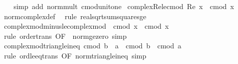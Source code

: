 \begin{isabellebody}
%
\isadelimproof
\ \ %
\endisadelimproof
%
\isatagproof
{}\isamarkupfalse%
\ {\isacharparenleft}{\kern0pt}simp\ add{\isacharcolon}{\kern0pt}\ norm{\isacharunderscore}{\kern0pt}mult\ cmod{\isacharunderscore}{\kern0pt}unit{\isacharunderscore}{\kern0pt}one{\isacharparenright}{\kern0pt}%
\endisatagproof
{\isafoldproof}%
%
\isadelimproof
\isanewline
%
\endisadelimproof
\isanewline
{}\isamarkupfalse%
\ complex{\isacharunderscore}{\kern0pt}Re{\isacharunderscore}{\kern0pt}le{\isacharunderscore}{\kern0pt}cmod{\isacharcolon}{\kern0pt}\ {\isachardoublequoteopen}Re\ x\ {\isasymle}\ cmod\ x{\isachardoublequoteclose}\isanewline
%
\isadelimproof
\ \ %
\endisadelimproof
%
\isatagproof
{}\isamarkupfalse%
\ norm{\isacharunderscore}{\kern0pt}complex{\isacharunderscore}{\kern0pt}def\ \isamarkupfalse%
\ {\isacharparenleft}{\kern0pt}rule\ real{\isacharunderscore}{\kern0pt}sqrt{\isacharunderscore}{\kern0pt}sum{\isacharunderscore}{\kern0pt}squares{\isacharunderscore}{\kern0pt}ge{}{\isacharparenright}{\kern0pt}%
\endisatagproof
{\isafoldproof}%
%
\isadelimproof
\isanewline
%
\endisadelimproof
\isanewline
{}\isamarkupfalse%
\ complex{\isacharunderscore}{\kern0pt}mod{\isacharunderscore}{\kern0pt}minus{\isacharunderscore}{\kern0pt}le{\isacharunderscore}{\kern0pt}complex{\isacharunderscore}{\kern0pt}mod{\isacharcolon}{\kern0pt}\ {\isachardoublequoteopen}{\isacharminus}{\kern0pt}\ cmod\ x\ {\isasymle}\ cmod\ x{\isachardoublequoteclose}\isanewline
%
\isadelimproof
\ \ %
\endisadelimproof
%
\isatagproof
{}\isamarkupfalse%
\ {\isacharparenleft}{\kern0pt}rule\ order{\isacharunderscore}{\kern0pt}trans\ {\isacharbrackleft}{\kern0pt}OF\ {\isacharunderscore}{\kern0pt}\ norm{\isacharunderscore}{\kern0pt}ge{\isacharunderscore}{\kern0pt}zero{\isacharbrackright}{\kern0pt}{\isacharparenright}{\kern0pt}\ simp%
\endisatagproof
{\isafoldproof}%
%
\isadelimproof
\isanewline
%
\endisadelimproof
\isanewline
{}\isamarkupfalse%
\ complex{\isacharunderscore}{\kern0pt}mod{\isacharunderscore}{\kern0pt}triangle{\isacharunderscore}{\kern0pt}ineq{}{\isacharcolon}{\kern0pt}\ {\isachardoublequoteopen}cmod\ {\isacharparenleft}{\kern0pt}b\ {\isacharplus}{\kern0pt}\ a{\isacharparenright}{\kern0pt}\ {\isacharminus}{\kern0pt}\ cmod\ b\ {\isasymle}\ cmod\ a{\isachardoublequoteclose}\isanewline
%
\isadelimproof
\ \ %
\endisadelimproof
%
\isatagproof
{}\isamarkupfalse%
\ {\isacharparenleft}{\kern0pt}rule\ ord{\isacharunderscore}{\kern0pt}le{\isacharunderscore}{\kern0pt}eq{\isacharunderscore}{\kern0pt}trans\ {\isacharbrackleft}{\kern0pt}OF\ norm{\isacharunderscore}{\kern0pt}triangle{\isacharunderscore}{\kern0pt}ineq{}{\isacharbrackright}{\kern0pt}{\isacharparenright}{\kern0pt}\ simp%

\end{isabellebody}
